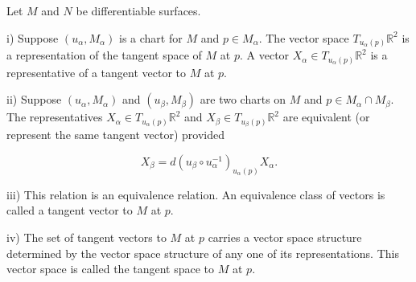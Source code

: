 Let $M$ and $N$ be differentiable surfaces.

i) Suppose $(u_\alpha, M_\alpha)$ is a chart for $M$ and $p \in M_\alpha$. The vector space $T_{u_\alpha(p)} \mathbb{R}^2$ is a representation of the tangent space of $M$ at $p$. A vector $X_\alpha \in T_{u_\alpha(p)} \mathbb{R}^2$ is a representative of a tangent vector to $M$ at $p$.

ii) Suppose $(u_\alpha, M_\alpha)$ and $(u_\beta, M_\beta)$ are two charts on $M$ and $p \in M_\alpha \cap M_\beta$. The representatives $X_\alpha \in T_{u_\alpha(p)} \mathbb{R}^2$ and $X_\beta \in T_{u_\beta(p)} \mathbb{R}^2$ are equivalent (or represent the same tangent vector) provided

$$X_\beta = d(u_\beta \circ u_\alpha^{-1})_{u_\alpha(p)} X_\alpha.$$

iii) This relation is an equivalence relation. An equivalence class of vectors is called a tangent vector to $M$ at $p$.

iv) The set of tangent vectors to $M$ at $p$ carries a vector space structure determined by the vector space structure of any one of its representations. This vector space is called the tangent space to $M$ at $p$.
